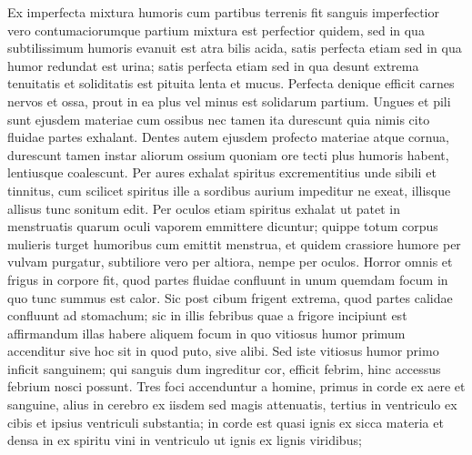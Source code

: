 Ex imperfecta mixtura humoris cum partibus terrenis fit sanguis imperfectior vero contumaciorumque partium mixtura est 
perfectior quidem, sed in qua subtilissimum humoris evanuit est atra bilis acida, satis perfecta etiam sed in qua humor redundat est urina; satis perfecta etiam sed in qua desunt extrema tenuitatis et soliditatis est pituita lenta et mucus. Perfecta denique efficit carnes nervos et ossa, prout in ea plus vel minus est solidarum partium. 
\pend%
\pstart%
Ungues et pili sunt ejusdem materiae cum ossibus nec tamen ita durescunt quia nimis cito fluidae partes exhalant. Dentes autem ejusdem profecto materiae atque cornua, durescunt tamen instar aliorum ossium quoniam ore tecti plus humoris habent, lentiusque coalescunt.
\pend
\newpage
\count{}
\count{}
\pstart Per aures exhalat spiritus excrementitius unde sibili et tinnitus, cum scilicet spiritus ille a sordibus aurium impeditur ne exeat, illisque allisus tunc sonitum edit.
\pend%
\pstart%
Per oculos etiam spiritus exhalat ut patet in menstruatis quarum oculi vaporem emmittere dicuntur; quippe totum corpus mulieris turget humoribus cum emittit menstrua, et quidem crassiore humore per vulvam purgatur, subtiliore vero per altiora, nempe per oculos.
\pend%
\pstart%
Horror omnis et frigus in corpore fit, quod partes fluidae confluunt in unum quemdam focum in quo tunc summus est calor.
Sic post cibum frigent extrema, quod partes calidae confluunt ad stomachum; sic in illis febribus quae a frigore incipiunt est affirmandum illas habere aliquem focum in quo vitiosus humor primum accenditur sive hoc sit in
quod puto, sive alibi.
Sed iste vitiosus humor primo inficit sanguinem; qui sanguis dum ingreditur cor, efficit febrim, hinc accessus febrium nosci possunt.
\pend%
\count{}
\count{}
\pstart%
Tres
%
foci accenduntur a homine, primus in corde ex aere et sanguine, alius in cerebro ex iisdem sed magis attenuatis, tertius in ventriculo ex cibis et ipsius ventriculi substantia; in corde est quasi ignis ex sicca materia et densa in  ex spiritu vini in ventriculo ut ignis ex lignis viridibus;
